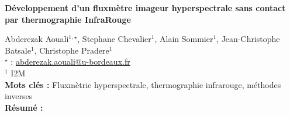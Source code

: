 


    \newpage


%
\begin{flushleft}
\addtocounter{section}{1}
{\Large \textbf{Développement d'un fluxmètre imageur hyperspectrale sans contact  par thermographie InfraRouge}}\label{ref:63}
\end{flushleft}
%
Abderezak Aouali$^{1,\star}$, Stephane Chevalier$^{1}$, Alain Sommier$^{1}$, Jean-Christophe Batsale$^{1}$, Christophe Pradere$^{1}$\\[2mm]
$^{\star}$ \Letter : \url{abderezak.aouali@u-bordeaux.fr}\\[2mm]
{\footnotesize $^{1}$ I2M}\\
[4mm]
%
\noindent \textbf{Mots clés : } Fluxmètrie hyperspectrale, thermographie infrarouge, méthodes inverses\\[4mm]
%
\noindent \textbf{Résumé : } 

